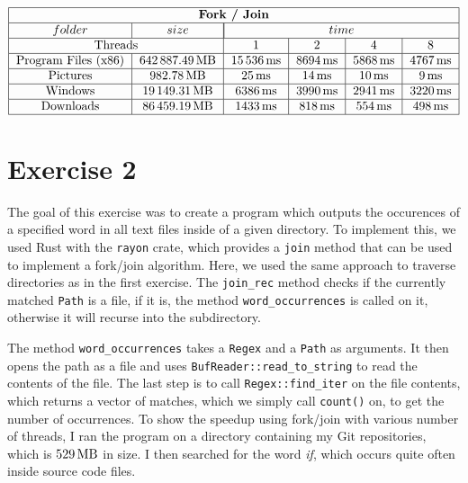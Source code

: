 \documentclass{article}
\begin{document}
    \begin{doublespacing}
      \begin{align*}
        \begin{tabular}{|*{6}{c|}}
          \hline
          \multicolumn{6}{|c|}{\bfseries Fork / Join} \\
          \hline
          $folder$ & $size$ & \multicolumn{4}{|c|}{$time$} \\
          \hline
          \multicolumn{2}{|c|}{Threads} & 1 & 2 & 4 & 8 \\
          \hline
          Program Files (x86) & $\SI{642887.49}{\mega\byte}$ & $\SI{15536}{\milli\second}$ & $\SI{8694}{\milli\second}$ & $\SI{5868}{\milli\second}$ & $\SI{4767}{\milli\second}$ \\
          \hline
          Pictures & $\SI{982.78}{\mega\byte}$ & $\SI{25}{\milli\second}$ & $\SI{14}{\milli\second}$ & $\SI{10}{\milli\second}$ & $\SI{9}{\milli\second}$ \\
          \hline
          Windows & $\SI{19149.31}{\mega\byte}$ & $\SI{6386}{\milli\second}$ & $\SI{3990}{\milli\second}$ & $\SI{2941}{\milli\second}$ & $\SI{3220}{\milli\second}$ \\
          \hline
          Downloads & $\SI{86459.19}{\mega\byte}$ & $\SI{1433}{\milli\second}$ & $\SI{818}{\milli\second}$ & $\SI{554}{\milli\second}$& $\SI{498}{\milli\second}$ \\
          \hline
        \end{tabular}
      \end{align*}
    \end{doublespacing}

  \section{Exercise 2}

  The goal of this exercise was to create a program which outputs the occurences of a specified word in all text files inside of a given directory. To implement this, we used Rust with the \texttt{rayon} crate, which provides a \texttt{join} method that can be used to implement a fork/join algorithm. Here, we used the same approach to traverse directories as in the first exercise. The \texttt{join\_rec} method checks if the currently matched \texttt{Path} is a file, if it is, the method \texttt{word\_occurrences} is called on it, otherwise it will recurse into the subdirectory.

  The method \texttt{word\_occurrences} takes a \texttt{Regex} and a \texttt{Path} as arguments. It then opens the path as a file and uses \texttt{BufReader::read\_to\_string} to read the contents of the file. The last step is to call \texttt{Regex::find\_iter} on the file contents, which returns a vector of matches, which we simply call \texttt{count()} on, to get the number of occurrences. To show the speedup using fork/join with various number of threads, I ran the program on a directory containing my Git repositories, which is $\SI{529}{\mega\byte}$ in size. I then searched for the word \textit{if}, which occurs quite often inside source code files.
\end{document}
